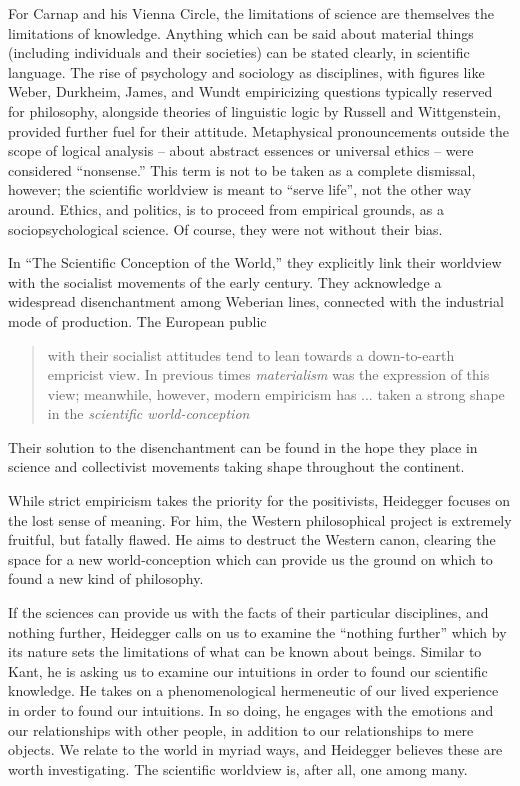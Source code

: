 \documentclass[leqno, 12pt]{turabian-researchpaper}
\begin{document}
	For Carnap and his Vienna Circle, the limitations of science are themselves
	the limitations of knowledge. Anything which can be said about material things
	(including individuals and their societies) can be stated clearly, in
	scientific language. The rise of psychology and sociology as disciplines, with
	figures like Weber, Durkheim, James, and Wundt empiricizing questions typically
	reserved for philosophy, alongside theories of linguistic logic by Russell and
	Wittgenstein, provided further fuel for their attitude. Metaphysical
	pronouncements outside the scope of logical analysis -- about abstract essences
	or universal ethics -- were considered \enquote{nonsense.} This term is not to
	be taken as a complete dismissal, however; the scientific worldview is meant to
	\enquote{serve life}, not the other way around. Ethics, and politics, is to
	proceed from empirical grounds, as a sociopsychological science. Of course, they
	were not without their bias.

	In \enquote{The Scientific Conception of the World,} \nocite{hahn1973} they explicitly
	link their worldview with the socialist movements of the early 
	century. They acknowledge a widespread disenchantment among Weberian lines,
	connected with the industrial mode of production. The European public \blockquote[{\cite[21f]{hahn1973}}]{with their socialist attitudes tend to lean towards a down-to-earth empricist view. In previous times \emph{materialism} was the expression of this view; meanwhile, however, modern empiricism has ... taken a strong shape in the \emph{scientific world-conception}}.
	Their solution to the disenchantment can be found in the hope they place in
	science and collectivist movements taking shape throughout the continent.

	While strict empiricism takes the priority for the positivists, Heidegger focuses
	on the lost sense of meaning. For him, the Western philosophical project is extremely
	fruitful, but fatally flawed. He aims to destruct the Western canon, clearing
	the space for a new world-conception which can provide us the ground on which
	to found a new kind of philosophy.

	If the sciences can provide us with the facts of their particular disciplines,
	and nothing further, Heidegger calls on us to examine the \enquote{nothing further}
	which by its nature sets the limitations of what can be known about beings.
	Similar to Kant, he is asking us to examine our intuitions in order to found our
	scientific knowledge. He takes on a phenomenological hermeneutic of our lived
	experience in order to found our intuitions. In so doing, he engages with the
	emotions and our relationships with other people, in addition to our relationships
	to mere objects. We relate to the world in myriad ways, and Heidegger believes
	these are worth investigating. The scientific worldview is, after all, one
	among many.
\end{document}
